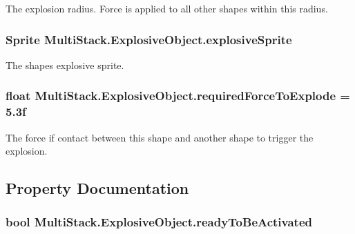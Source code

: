 The explosion radius. Force is applied to all other shapes within this radius. 

\hypertarget{class_multi_stack_1_1_explosive_object_a837c3ceaac83c66cbb0b35de25a4821e}{}
\subsubsection[{explosive\+Sprite}]{\setlength{\rightskip}{0pt plus 5cm}Sprite Multi\+Stack.\+Explosive\+Object.\+explosive\+Sprite}\label{class_multi_stack_1_1_explosive_object_a837c3ceaac83c66cbb0b35de25a4821e}


The shapes explosive sprite. 

\hypertarget{class_multi_stack_1_1_explosive_object_aa56e67200c145c64a54a898e5b060456}{}
\subsubsection[{required\+Force\+To\+Explode}]{\setlength{\rightskip}{0pt plus 5cm}float Multi\+Stack.\+Explosive\+Object.\+required\+Force\+To\+Explode = 5.\+3f}\label{class_multi_stack_1_1_explosive_object_aa56e67200c145c64a54a898e5b060456}


The force if contact between this shape and another shape to trigger the explosion. 



\subsection{Property Documentation}
\hypertarget{class_multi_stack_1_1_explosive_object_a0ecb247bb628265fb91df8d2c0b32a72}{}
\subsubsection[{ready\+To\+Be\+Activated}]{\setlength{\rightskip}{0pt plus 5cm}bool Multi\+Stack.\+Explosive\+Object.\+ready\+To\+Be\+Activated\hspace{0.3cm}{\ttfamily [get]}}\label{class_multi_stack_1_1_explosive_object_a0ecb247bb628265fb91df8d2c0b32a72}


